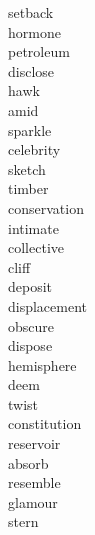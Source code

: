 \documentclass[a4paper, 11pt]{ctexart}
\begin{document}
\begin{multicols*}{3}
\begin{description}
\item[setback]

\item[hormone]

\item[petroleum]

\item[disclose]

\item[hawk]

\item[amid]

\item[sparkle]

\item[celebrity]

\item[sketch]

\item[timber]

\item[conservation]

\item[intimate]

\item[collective]

\item[cliff]

\item[deposit]

\item[displacement]

\item[obscure]

\item[dispose]

\item[hemisphere]

\item[deem]

\item[twist]

\item[constitution]

\item[reservoir]

\item[absorb]

\item[resemble]

\item[glamour]

\item[stern]


\end{description}
\end{multicols*}
\end{document}
